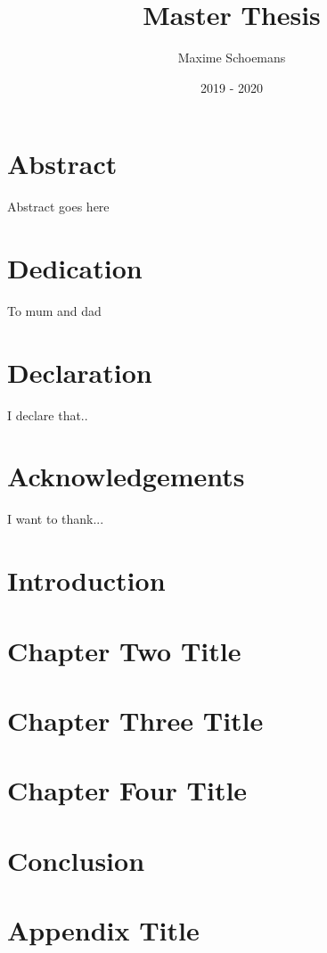\documentclass[12pt, twoside]{report}
\title{Master Thesis}
\author{Maxime Schoemans}
\date{2019 - 2020}
\begin{document}


\chapter*{Abstract}
Abstract goes here
 
\chapter*{Dedication}
To mum and dad
 
\chapter*{Declaration}
I declare that..
 
\chapter*{Acknowledgements}
I want to thank...
 
\tableofcontents

\chapter{Introduction}

 
\chapter{Chapter Two Title}

 
\chapter{Chapter Three Title}

 
\chapter{Chapter Four Title}

 
\chapter{Conclusion}


\appendix

\chapter{Appendix Title}


\nocite{*}
\printbibliography
\end{document}
